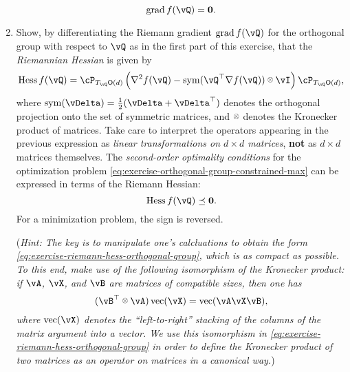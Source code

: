 \documentclass[../../book-main.tex]{subfiles}
\begin{document}
\begin{exercise}
\begin{enumerate}
        \begin{equation*}
            \mathrm{grad}\, f(\vQ) = \mathbf{0}.
        \end{equation*}
        \item Show, by differentiating the Riemann gradient $\mathrm{grad}\, f(\vQ)$ for the orthogonal group with respect to $\vQ$ as in the first part of this exercise, that the \textit{Riemannian Hessian} is given by
        \begin{equation}\label{eq:exercise-riemann-hess-orthogonal-group}
            \mathrm{Hess}\, f(\vQ) = \cP_{T_{\vQ}\O(d)} \left( 
            \nabla^2 f(\vQ) - \Symm(\vQ^\top \nabla f(\vQ)) \kron \vI
            \right) \cP_{T_{\vQ}\O(d)},
        \end{equation}
        where $\Symm(\vDelta) = \tfrac{1}{2}(\vDelta + \vDelta^\top)$ denotes the orthogonal projection onto the set of symmetric matrices, and $\kron$ denotes the Kronecker product of matrices.
        Take care to interpret the operators appearing in the previous expression as \textit{linear transformations on ${d \times d}$ matrices}, \textbf{not} as $d \times d$ matrices themselves.
        The \textit{second-order optimality conditions} for the optimization problem \eqref{eq:exercise-orthogonal-group-constrained-max} can be expressed in terms of the Riemann Hessian:
        \begin{equation*}
            \mathrm{Hess}\, f(\vQ) \preceq \mathbf{0}.
        \end{equation*}
        For a minimization problem, the sign is reversed.

        (\textit{Hint: The key is to manipulate one's calcluations to obtain the form \eqref{eq:exercise-riemann-hess-orthogonal-group}, which is as compact as possible. To this end, make use of the following isomorphism of the Kronecker product: if $\vA$, $\vX$, and $\vB$ are matrices of compatible sizes, then one has
        \begin{equation*}
            (\vB^\top \kron \vA) \Vec(\vX) = \Vec(\vA \vX \vB),
        \end{equation*}
        where $\Vec(\vX)$ denotes the ``left-to-right'' stacking of the columns of the matrix argument into a vector. We use this isomorphism in \eqref{eq:exercise-riemann-hess-orthogonal-group} in order to define the Kronecker product of two matrices as an operator on matrices in a canonical way.})
        

\end{enumerate}
\end{exercise}
\end{document}
